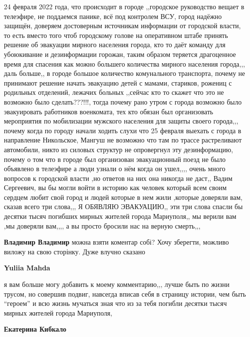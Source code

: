 24 февраля 2022 года, что происходит в городе ,,городское руководство вещает в
телеэфире, не поддаемся панике, всё под контролем ВСУ, город надёжно
защищён, доверяем достоверным источникам информации от городской власти, то есть
вместо того чтоб городскому голове на оперативном штабе принять решение об
эвакуации мирного населения города, кто то даёт команду для убоюкивание и
дезинформации горожан, таким образом теряется драгоценное время для спасения как
можно большего количества мирного населения города,,, даль больше,, в городе
большое количество комунального транспорта, почему не принимают решение начать
эвакуацию детей с мамами, стариков, рожениц с родильных отделений, лежачих
больных ,,сейчас кто то скажет что это не возможно было сделать???!!!, тогда
почему рано утром с города возможно было эвакуировать работников военкомата, тех
кто обязан был организовать мероприятия по мобилизации мужского населения для
защиты своего города,,, почему когда по городу начали ходить слухи что 25
февраля выехать с города в направление Никольское, Мангуш не возможно что там по
трассе растреливают автомобили, никто из силовых структур не опровергнул эту
дезинформацию, почему о том что в городе был организован эвакуационный поезд не
было объявлено в телеэфире а люди узнали о нём когда он ушел,,,, очень много
вопросов к городской власти ,но ответов на них она никогда не даст,, Вадим
Сергеевич, вы бы могли войти в историю как человек который всем своим сердцем
любит свой город и людей которые в нем жили ,которые доверяли вам, сказав всего
три слова,,, Я ОБЯВЛЯЮ ЭВАКУАЦИЮ,, эти три слова спасли бы десятки тысяч
погибших мирных жителей города Мариуполя,, мы верили вам ,мы доверяли вам,,,, а
вы просто бросили нас на верную смерть,,,

\begin{itemize} %
\textbf{Владимир Владимир} можна взяти коментар собі? Хочу зберегти, можливо виложу на свою сторінку. Дуже влучно сказано

\textbf{Yuliia Mahda} 

я вам больше могу добавить к моему комментарию,,, лучше быть по жизни трусом, но
совершив подвиг, навсегда вписав себя в страницу истории, чем быть \enquote{героем} и всю
жизнь мучаться зная что из за тебя погибли десятки тысяч мирных жителей города
Мариуполя,

\end{itemize} %

\textbf{Екатерина Кибкало} 

